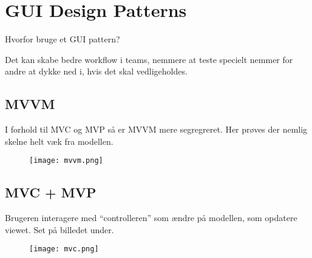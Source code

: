 \documentclass[../SWD_disp.tex]{subfiles}
\begin{document}
\section{GUI Design Patterns}
Hvorfor bruge et GUI pattern? 

Det kan skabe bedre workflow i teams, nemmere at teste specielt nemmer for andre at dykke ned i, hvis det skal vedligeholdes.


\subsection{MVVM}
I forhold til MVC og MVP så er MVVM mere segregreret. Her prøves der nemlig skelne helt væk fra modellen.

\begin{figure}[H]
	\centering
	\texttt{[image: mvvm.png]}
\end{figure}
\subsection{MVC + MVP}
Brugeren interagere med ``controlleren'' som ændre på modellen, som opdatere viewet. Set på billedet under.
\begin{figure}[H]
	\centering
	\texttt{[image: mvc.png]}
\end{figure}
\end{document}
